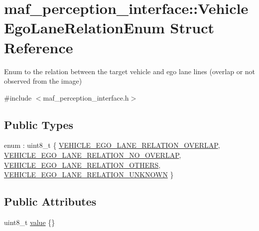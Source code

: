 \hypertarget{structmaf__perception__interface_1_1VehicleEgoLaneRelationEnum}{}\section{maf\+\_\+perception\+\_\+interface\+:\+:Vehicle\+Ego\+Lane\+Relation\+Enum Struct Reference}
\label{structmaf__perception__interface_1_1VehicleEgoLaneRelationEnum}


Enum to the relation between the target vehicle and ego lane lines (overlap or not observed from the image)  




{\ttfamily \#include $<$maf\+\_\+perception\+\_\+interface.\+h$>$}

\subsection*{Public Types}
\begin{DoxyCompactItemize}
\item 
enum \+: uint8\+\_\+t \{ \hyperlink{structmaf__perception__interface_1_1VehicleEgoLaneRelationEnum_adbab113da26395a3812ef94c6013ea1aa37b2df4f1a9c5ab537411d5e4321de41}{V\+E\+H\+I\+C\+L\+E\+\_\+\+E\+G\+O\+\_\+\+L\+A\+N\+E\+\_\+\+R\+E\+L\+A\+T\+I\+O\+N\+\_\+\+O\+V\+E\+R\+L\+AP}, 
\hyperlink{structmaf__perception__interface_1_1VehicleEgoLaneRelationEnum_adbab113da26395a3812ef94c6013ea1aad89fb87c8b66388f7d2bef5c8ba18ba5}{V\+E\+H\+I\+C\+L\+E\+\_\+\+E\+G\+O\+\_\+\+L\+A\+N\+E\+\_\+\+R\+E\+L\+A\+T\+I\+O\+N\+\_\+\+N\+O\+\_\+\+O\+V\+E\+R\+L\+AP}, 
\hyperlink{structmaf__perception__interface_1_1VehicleEgoLaneRelationEnum_adbab113da26395a3812ef94c6013ea1aacd32faaf6c4498ac5f134b576f682754}{V\+E\+H\+I\+C\+L\+E\+\_\+\+E\+G\+O\+\_\+\+L\+A\+N\+E\+\_\+\+R\+E\+L\+A\+T\+I\+O\+N\+\_\+\+O\+T\+H\+E\+RS}, 
\hyperlink{structmaf__perception__interface_1_1VehicleEgoLaneRelationEnum_adbab113da26395a3812ef94c6013ea1aab0905a4b298cb7a98e2de657f29f498c}{V\+E\+H\+I\+C\+L\+E\+\_\+\+E\+G\+O\+\_\+\+L\+A\+N\+E\+\_\+\+R\+E\+L\+A\+T\+I\+O\+N\+\_\+\+U\+N\+K\+N\+O\+WN}
 \}
\end{DoxyCompactItemize}
\subsection*{Public Attributes}
\begin{DoxyCompactItemize}
\item 
uint8\+\_\+t \hyperlink{structmaf__perception__interface_1_1VehicleEgoLaneRelationEnum_a17fd026c6cf0661c3ed99a9b2ceb35db}{value} \{\}
\end{DoxyCompactItemize}


